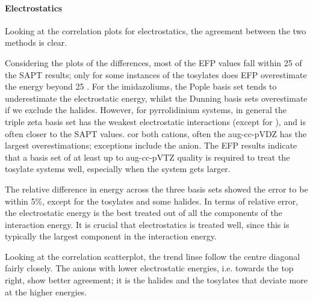 \begin{footnotesize}





\paragraph{Electrostatics}
Looking at the correlation plots for electrostatics, the agreement between the two methods is clear.

Considering the plots of the differences, most of the EFP values fall within 25 \enUnit of the SAPT results; only for some instances of the tosylates does EFP overestimate the energy beyond 25 \enUnit. 
For the imidazoliums, the Pople basis set tends to underestimate the electrostatic energy, whilst the Dunning basis sets overestimate if we exclude the halides.
However, for pyrrolidinium systems, in general the triple zeta basis set has the weakest electrostatic interactions (except for \ntf), and is often closer to the SAPT values.
cor both cations, often the aug-cc-pVDZ has the largest overestimations; exceptions include the \ntf anion. 
The EFP results indicate that a basis set of at least up to aug-cc-pVTZ quality is required to treat the tosylate systems well, especially when the system gets larger. 


The relative difference in energy across the three basis sets showed the error to be within 5\%, except for the tosylates and some halides.
In terms of relative error, the electrostatic energy is the best treated out of all the components of the interaction energy.
It is crucial that electrostatics is treated well, since this is typically the largest component in the interaction energy. 


Looking at the correlation scatterplot, the trend linse follow the centre diagonal fairly closely.
The anions with lower electrostatic energies, i.e. towards the top right, show better agreement; it is the halides and the tosylates that deviate more at the higher energies.


\end{footnotesize}
